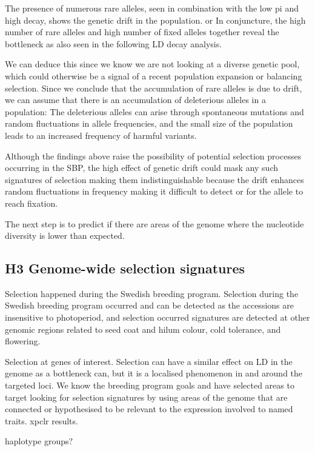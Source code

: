\documentclass[9pt, onecolumn,twoside]{gsajnl}
\begin{document}
The presence of numerous rare alleles, seen in combination with the low pi and high decay, shows the genetic drift in the population. 
or
In conjuncture, the high number of rare alleles and high number of fixed alleles together reveal the bottleneck as also seen in the following LD decay analysis. 

We can deduce this since we know we are not looking at a diverse genetic pool, which could otherwise be a signal of a recent population expansion or balancing selection. Since we conclude that the accumulation of rare alleles is due to drift, we can assume that there is an accumulation of deleterious alleles in a population: The deleterious alleles can arise through spontaneous mutations and random fluctuations in allele frequencies, and the small size of the population leads to an increased frequency of harmful variants.

Although the findings above raise the possibility of potential selection processes occurring in the SBP, the high effect of genetic drift could mask any such signatures of selection making them indistinguishable because the drift enhances random fluctuations in  frequency making it difficult to detect or for the allele to reach fixation.



The next step is to predict if there are areas of the genome where the nucleotide diversity is lower than expected. 

\subsection{H3 Genome-wide selection signatures} 

Selection happened during the Swedish breeding program.
Selection during the Swedish breeding program occurred and can be detected as the accessions are insensitive to photoperiod, and selection occurred signatures are detected at other genomic regions related to seed coat and hilum colour, cold tolerance, and flowering.

Selection at genes of interest.
 Selection can have a similar effect on LD in the genome as a bottleneck can, but it is a localised phenomenon in and around the targeted loci.
We know the breeding program goals and have selected areas to target looking for selection signatures by using areas of the genome that are connected or hypothesised to be relevant to the expression involved to named traits.   
xpclr results. 

haplotype groups? 
\end{document}
